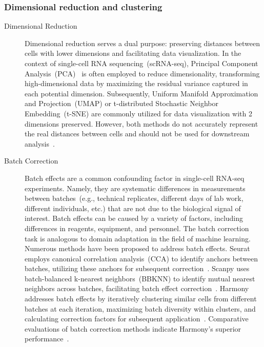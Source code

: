 \subsubsection{Dimensional reduction and clustering}
\label{background:sec2:dr_n_clustering}
\begin{description}
	\item[Dimensional Reduction]
	Dimensional reduction serves a dual purpose: preserving distances between cells with lower dimensions and facilitating data visualization. In the context of single-cell RNA sequencing~(scRNA-seq), Principal Component Analysis~(PCA)~\citep{hotelling1933pca} is often employed to reduce dimensionality, transforming high-dimensional data by maximizing the residual variance captured in each potential dimension. Subsequently, Uniform Manifold Approximation and Projection~(UMAP) or t-distributed Stochastic Neighbor Embedding~(t-SNE) are commonly utilized for data visualization with 2 dimensions preserved. However, both methods do not accurately represent the real distances between cells and should not be used for downstream analysis~\citep{mcinnes2018umap, van2008tsne}.

	\item[Batch Correction]
	Batch effects are a common confounding factor in single-cell RNA-seq experiments. Namely, they are systematic differences in measurements between batches~(e.g., technical replicates, different days of lab work, different individuals, etc.) that are not due to the biological signal of interest. Batch effects can be caused by a variety of factors, including differences in reagents, equipment, and personnel. The batch correction task is analogous to domain adaptation in the field of machine learning. Numerous methods have been proposed to address batch effects. Seurat employs canonical correlation analysis~(CCA) to identify anchors between batches, utilizing these anchors for subsequent correction~\citep{stuart2019seurat3}. Scanpy uses batch-balanced k-nearest neighbors~(BBKNN) to identify mutual nearest neighbors across batches, facilitating batch effect correction~\citep{polanski2020bbknn}. Harmony addresses batch effects by iteratively clustering similar cells from different batches at each iteration, maximizing batch diversity within clusters, and calculating correction factors for subsequent application~\citep{korsunsky2019harmony}. Comparative evaluations of batch correction methods indicate Harmony's superior performance~\citep{tran2020benchmark}.



\end{description}
